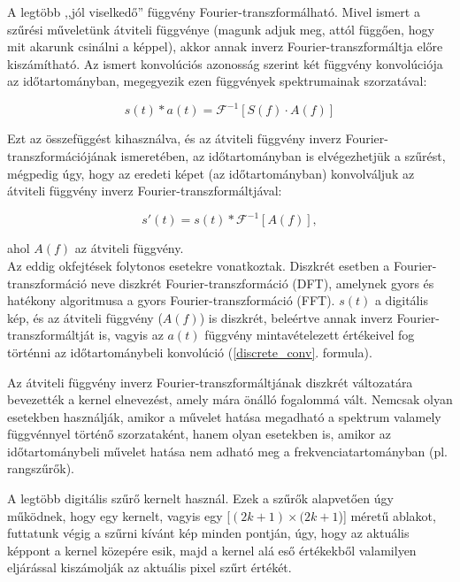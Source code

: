 \documentclass[a4paper,12pt]{article}
\begin{document}
A legtöbb ,,jól viselkedő'' függvény Fourier-transzformálható. Mivel ismert a
szűrési műveletünk átviteli függvénye (magunk adjuk meg, attól függően, hogy mit
akarunk csinálni a képpel), akkor annak inverz Fourier-transzformáltja előre
kiszámítható. Az ismert konvolúciós azonosság szerint két függvény konvolúciója
az időtartományban, megegyezik ezen függvények spektrumainak szorzatával:

\begin{equation} \label{conv}
s(t) * a(t) = \mathcal{F}^{-1} [ S(f) \cdot A(f) ]
\end{equation}

Ezt az összefüggést kihasználva, és az átviteli függvény inverz
Fourier-transzformációjának ismeretében, az időtartományban is elvégezhetjük a
szűrést, mégpedig úgy, hogy az eredeti képet (az időtartományban) konvolváljuk
az átviteli függvény inverz Fourier-transzformáltjával: 

\begin{equation} \label{discrete_conv}
s'(t) = s(t) * \mathcal{F}^{-1}[A(f)], 
\end{equation}

ahol $A(f)$ az átviteli függvény.\\

Az eddig okfejtések folytonos esetekre vonatkoztak. Diszkrét esetben a
Fourier-transzformáció neve diszkrét Fourier-transzformáció (DFT), amelynek
gyors és hatékony algoritmusa a gyors Fourier-transzformáció (FFT). $s(t)$ a
digitális kép, és az átviteli függvény ($A(f)$) is diszkrét, beleértve annak
inverz Fourier-transzformáltját is, vagyis az $a(t)$ függvény mintavételezett
értékeivel fog történni az időtartománybeli konvolúció (\ref{discrete_conv}.
formula).

Az átviteli függvény inverz Fourier-transzformáltjának diszkrét változatára
bevezették a kernel elnevezést, amely mára önálló fogalommá vált. Nemcsak olyan
esetekben használják, amikor a művelet hatása megadható a spektrum valamely
függvénnyel történő szorzataként, hanem olyan esetekben is, amikor az
időtartománybeli művelet hatása nem adható meg a frekvenciatartományban (pl.
rangszűrők). 

A legtöbb digitális szűrő kernelt használ. Ezek a szűrők alapvetően úgy
működnek, hogy egy kernelt, vagyis egy [$(2k+1) \times (2k+1$)] méretű ablakot,
futtatunk végig a szűrni kívánt kép minden pontján, úgy, hogy az aktuális
képpont a kernel közepére esik, majd a kernel alá eső értékekből valamilyen
eljárással kiszámolják az aktuális pixel szűrt értékét. 
\end{document}
